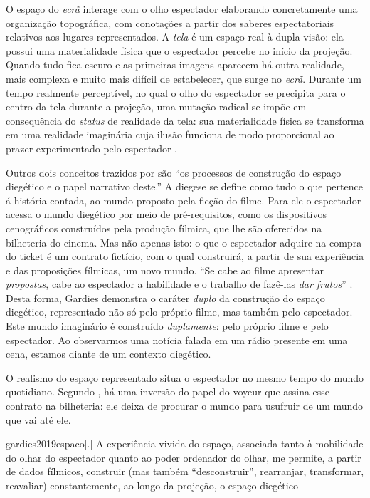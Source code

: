O espaço do \emph{ecrã} interage com o olho espectador elaborando
concretamente uma organização topográfica, com conotações a partir dos
saberes espectatoriais relativos aos lugares representados. A
\emph{tela} é um espaço real à dupla visão: ela possui uma
materialidade física que o espectador percebe no início da projeção.
Quando tudo fica escuro e as primeiras imagens aparecem há outra
realidade, mais complexa e muito mais difícil de estabelecer, que surge
no \emph{ecrã}. Durante um tempo realmente perceptível, no qual o olho
do espectador se precipita para o centro da tela durante a projeção,
uma mutação radical se impõe em consequência do \emph{status} de
realidade da tela: sua materialidade física se transforma em uma
realidade imaginária cuja ilusão funciona de modo proporcional ao
prazer experimentado pelo espectador \parencite[22]{gardies2019espaco}.

Outros dois conceitos trazidos por \textcite{gardies2019espaco} são
\enquote{os processos de construção do espaço diegético e o papel
	narrativo deste.} A diegese se define como tudo o que pertence á
história contada, ao mundo proposto pela ficção do filme. Para ele o
espectador acessa o mundo diegético por meio de pré-requisitos, como os
dispositivos cenográficos construídos pela produção fílmica, que lhe
são oferecidos na bilheteria do cinema. Mas não apenas isto: o que o
espectador adquire na compra do ticket é um contrato fictício, com o
qual construirá, a partir de sua experiência e das proposições
fílmicas, um novo mundo. \enquote{Se cabe ao filme apresentar
	\emph{propostas}, cabe ao espectador a habilidade e o trabalho de
	fazê-las \emph{dar frutos}} \parencite[62]{gardies2019espaco}. Desta forma, Gardies demonstra o caráter
\emph{duplo} da construção do espaço diegético, representado não só
pelo próprio filme, mas também pelo espectador. Este mundo imaginário é
construído \emph{duplamente}: pelo próprio filme e pelo espectador. Ao
observarmos uma notícia falada em um rádio presente em uma cena,
estamos diante de um contexto diegético.

O realismo do espaço representado situa o espectador no mesmo tempo do
mundo quotidiano. Segundo \textcite{gardies2019espaco}, há uma inversão
do papel do voyeur que assina esse contrato na bilheteria: ele deixa de
procurar o mundo para usufruir de um mundo que vai até ele.

\begin{displaycquote}[67]{gardies2019espaco}[.]
	A experiência vivida do espaço, associada tanto à mobilidade do olhar do
	espectador quanto ao poder ordenador do olhar, me permite, a partir de
	dados fílmicos, construir (mas também \enquote{desconstruir}, rearranjar,
	transformar, reavaliar) constantemente, ao longo da projeção, o espaço
	diegético
\end{displaycquote}

